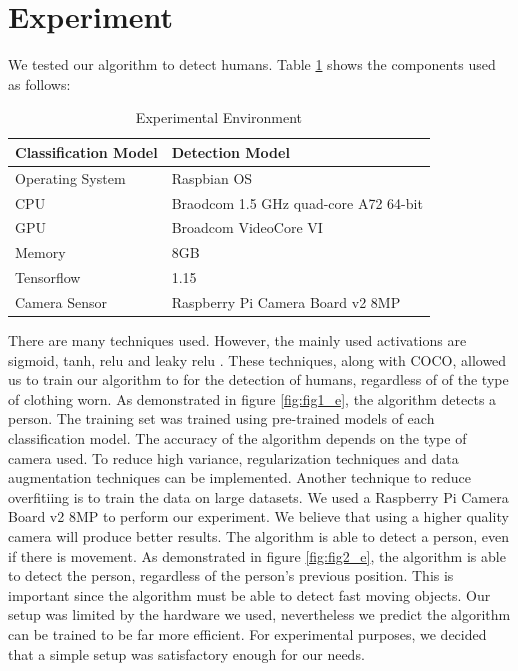 \section{Experiment}

We tested our algorithm to detect humans. Table \ref{table:1} shows the components used as follows:

\begin{table}[h]
\begin{center}
\begin{tabular}{ | m{3.5cm} | m{3.5cm}| } 
\hline
\textbf{Classification Model} & \textbf{Detection Model} \\ 
\hline
Operating System & Raspbian OS \\
\hline
CPU & Braodcom 1.5 GHz quad-core A72 64-bit \\
\hline
GPU & Broadcom VideoCore VI  \\
\hline
Memory & 8GB \\
\hline
Tensorflow & 1.15 \\
\hline
Camera Sensor & Raspberry Pi Camera Board v2 8MP \\
\hline
\end{tabular}
\caption{Experimental Environment}
\label{table:1}
\end{center}
\end{table}

There are many techniques used. However, the mainly used activations are sigmoid, tanh, relu and leaky relu \cite{Chauhan}. These techniques, along with COCO, allowed us to train our algorithm to for the detection of humans, regardless of of the type of clothing worn. As demonstrated in figure \ref{fig:fig1_e}, the algorithm detects a person. The training set was trained using pre-trained models of each classification model. The accuracy of the algorithm depends on the type of camera used. To reduce high variance, regularization techniques
and data augmentation techniques can be implemented. Another technique to reduce overfitiing is to train the data on large datasets. We used a Raspberry Pi Camera Board v2 8MP to perform our experiment. We believe that using a higher quality camera will produce better results. The algorithm is able to detect a person, even if there is movement. As demonstrated in figure \ref{fig:fig2_e}, the algorithm is able to detect the person, regardless of the person's previous position. This is important since the algorithm must be able to detect fast moving objects. Our setup was limited by the hardware we used, nevertheless we predict the algorithm can be trained to be far more efficient. For experimental purposes, we decided that a simple setup was satisfactory enough for our needs.

